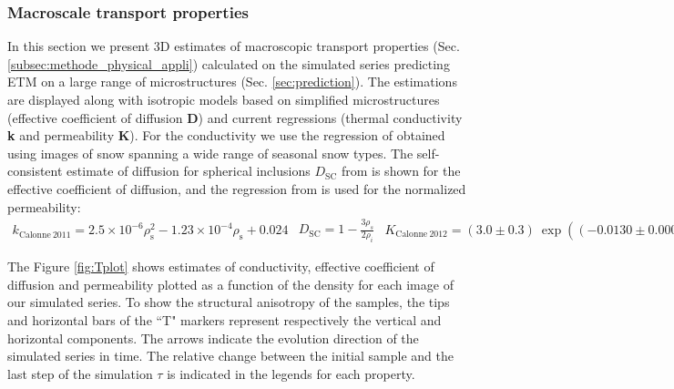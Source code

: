 \documentclass[draft,ms]{agujournal2019}
\begin{document}
\subsubsection{Macroscale transport properties}

In this section we present 3D estimates of macroscopic transport properties (Sec. \ref{subsec:methode_physical_appli}) calculated on the simulated series predicting ETM on a large range of microstructures (Sec. \ref{sec:prediction}). The estimations are displayed along with isotropic models based on simplified microstructures (effective coefficient of diffusion \textbf{D}) and current regressions (thermal conductivity \textbf{k} and permeability \textbf{K}). For the conductivity we use the regression of  obtained using images of snow spanning a wide range of seasonal snow types. The self-consistent estimate of diffusion for spherical inclusions $D_{\mathrm{SC}}$ from  is shown for the effective coefficient of diffusion, and the regression from  is used for the normalized permeability: \\
\begin{subequations}
\begin{align}
k_{\mathrm{Calonne\ 2011}}=2.5 \times 10^{-6} \rho_{\mathrm{s}}^{2}-1.23 \times 10^{-4} \rho_{\mathrm{s}}+0.024\end{align}
\begin{align}
D_{\mathrm{SC}} = 1 - \frac{3\rho_s}{2\rho_i}
\end{align}
\begin{align}
K_{\mathrm{Calonne\ 2012}}=(3.0 \pm 0.3)\ \exp \left(\left(-0.0130 \pm 0.0003\right) \rho_{\mathrm{s}}\right)
\end{align}
\end{subequations}

The Figure \ref{fig:Tplot} shows estimates of conductivity, effective coefficient of diffusion and permeability plotted as a function of the density for each image of our simulated series. To show the structural anisotropy of the samples, the tips and horizontal bars of the ``T" markers represent respectively the vertical and horizontal components. The arrows indicate the evolution direction of the simulated series in time. The relative change between the initial sample and the last step of the simulation $\tau$ is indicated in the legends for each property.
 
\end{document}
